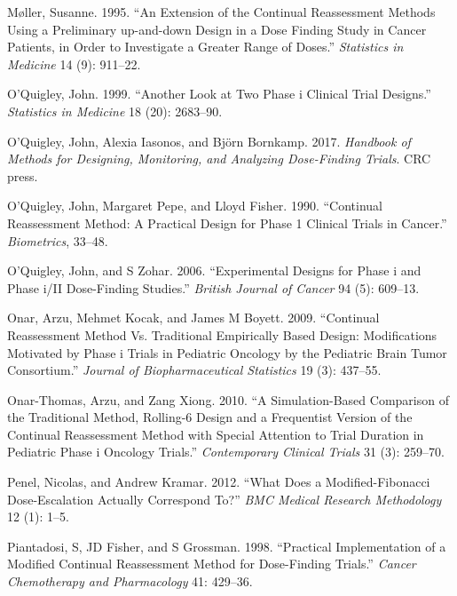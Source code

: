 \documentclass[
]{article}
\newlength{\cslhangindent}
\newlength{\cslentryspacingunit} %
\newenvironment{CSLReferences}[2] %
 {%
  \setlength{\parindent}{0pt}
  \ifodd #1
  \let\oldpar\par
  \def\par{\hangindent=\cslhangindent\oldpar}
  \fi
  \setlength{\parskip}{#2\cslentryspacingunit}
 }%
 {}
\begin{document}
\begin{CSLReferences}{1}{0}
\leavevmode{}%
Møller, Susanne. 1995. {``An Extension of the Continual Reassessment
Methods Using a Preliminary up-and-down Design in a Dose Finding Study
in Cancer Patients, in Order to Investigate a Greater Range of Doses.''}
\emph{Statistics in Medicine} 14 (9): 911--22.

\leavevmode{}%
O'Quigley, John. 1999. {``Another Look at Two Phase i Clinical Trial
Designs.''} \emph{Statistics in Medicine} 18 (20): 2683--90.

\leavevmode{}%
O'Quigley, John, Alexia Iasonos, and Björn Bornkamp. 2017.
\emph{Handbook of Methods for Designing, Monitoring, and Analyzing
Dose-Finding Trials}. CRC press.

\leavevmode{}%
O'Quigley, John, Margaret Pepe, and Lloyd Fisher. 1990. {``Continual
Reassessment Method: A Practical Design for Phase 1 Clinical Trials in
Cancer.''} \emph{Biometrics}, 33--48.

\leavevmode{}%
O'Quigley, John, and S Zohar. 2006. {``Experimental Designs for Phase i
and Phase i/II Dose-Finding Studies.''} \emph{British Journal of Cancer}
94 (5): 609--13.

\leavevmode{}%
Onar, Arzu, Mehmet Kocak, and James M Boyett. 2009. {``Continual
Reassessment Method Vs. Traditional Empirically Based Design:
Modifications Motivated by Phase i Trials in Pediatric Oncology by the
Pediatric Brain Tumor Consortium.''} \emph{Journal of Biopharmaceutical
Statistics} 19 (3): 437--55.

\leavevmode{}%
Onar-Thomas, Arzu, and Zang Xiong. 2010. {``A Simulation-Based
Comparison of the Traditional Method, Rolling-6 Design and a Frequentist
Version of the Continual Reassessment Method with Special Attention to
Trial Duration in Pediatric Phase i Oncology Trials.''}
\emph{Contemporary Clinical Trials} 31 (3): 259--70.

\leavevmode{}%
Penel, Nicolas, and Andrew Kramar. 2012. {``What Does a
Modified-Fibonacci Dose-Escalation Actually Correspond To?''} \emph{BMC
Medical Research Methodology} 12 (1): 1--5.

\leavevmode{}%
Piantadosi, S, JD Fisher, and S Grossman. 1998. {``Practical
Implementation of a Modified Continual Reassessment Method for
Dose-Finding Trials.''} \emph{Cancer Chemotherapy and Pharmacology} 41:
429--36.


\end{CSLReferences}
\end{document}
